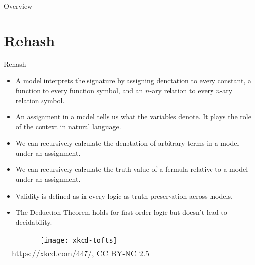 \setcounter{framenumber}{304}
\begin{frame}
	\maketitle
\end{frame}

\begin{frame}{Overview}
\tableofcontents
\end{frame}

\section{Rehash}
\begin{frame}{Rehash}
	
\begin{itemize}
	
		\item \alert{A model interprets the signature by assigning denotation to every constant, a function to every function symbol, and an $n$-ary relation to every $n$-ary relation symbol.}
		
		\item An assignment in a model tells us what the variables denote. It plays the role of the context in natural language. 
	
		\item We can recursively calculate the denotation of arbitrary terms in a model under an assignment.
		
		\item We can recursively calculate the truth-value of a formula relative to a model under an assignment.
		
		\item Validity is defined as in every logic as truth-preservation across models.
		
		\item \alert{The Deduction Theorem holds for first-order logic but doesn't lead to decidability.}
										
	\end{itemize}

\end{frame}

\begin{frame}


	
	\begin{center}
		\begin{tabular}{c}
		\texttt{[image: xkcd-tofts]}\\[-1ex]
		{\tiny \textcopyright~\url{https://xkcd.com/447/}, CC BY-NC 2.5}
		\end{tabular}
		\end{center}

\end{frame}
		

